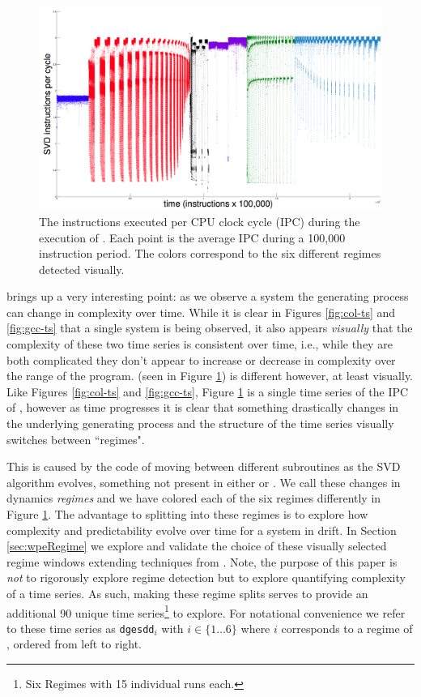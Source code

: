 \begin{figure}[t]
    \centering
    \includegraphics[width=\columnwidth]{figs/SVD1RegimesColored}
    \caption{The instructions executed per CPU clock cycle (IPC) during the execution of \svd. Each point is the average IPC during a 100,000 instruction period. The colors correspond to the six different regimes detected visually.}
    \label{fig:svd-ts-colored}
  \end{figure}

\svd brings up a very interesting point: as we observe a system the generating process can change in complexity over time. While it is clear in Figures \ref{fig:col-ts} and \ref{fig:gcc-ts} that a single system is being observed, it also appears \emph{visually} that the complexity of these two time series is consistent over time, i.e., while they are both complicated they don't appear to increase or decrease in complexity over the range of the program. \svd (seen in Figure \ref{fig:svd-ts-colored}) is different however, at least visually. Like Figures \ref{fig:col-ts} and \ref{fig:gcc-ts}, Figure \ref{fig:svd-ts-colored} is a single time series of the IPC of \svd, however as time progresses it is clear that something drastically changes in the underlying generating process and the structure of the time series  visually switches between ``regimes".

This is caused by the code of \svd moving between different subroutines as the SVD algorithm evolves, something not present in either \gcc or \col. We call these changes in \svd dynamics \emph{\svd regimes} and we have colored each of the six regimes differently in Figure \ref{fig:svd-ts-colored}. The advantage to splitting \svd into these regimes is to explore how complexity and predictability evolve over time for a system in drift. In Section \ref{sec:wpeRegime} we explore and validate the choice of these visually selected regime windows extending techniques from \cite{cao2004det}. Note, the purpose of this paper is \emph{not} to rigorously explore regime detection but to explore quantifying complexity of a time series. As such, making these regime splits serves to provide an additional 90 unique time series\footnote{Six Regimes with 15 individual runs each.} to explore. For notational convenience we refer to these time series as {\tt dgesdd$_i$} with $i \in \{1\dots6\}$ where $i$ corresponds to a regime of \svd, ordered from left to right.



